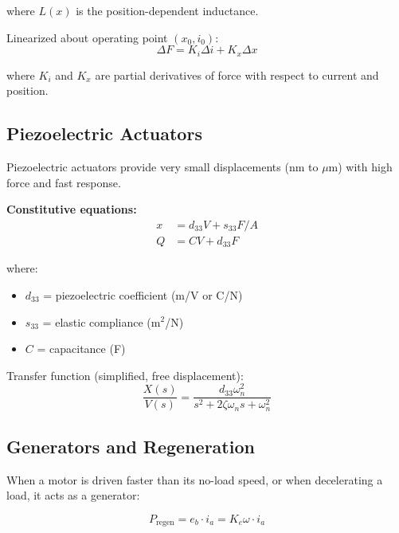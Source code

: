where $L(x)$ is the position-dependent inductance.

Linearized about operating point $(x_0, i_0)$:
\begin{equation}
\Delta F = K_i \Delta i + K_x \Delta x
\end{equation}

where $K_i$ and $K_x$ are partial derivatives of force with respect to current and position.

\subsection{Piezoelectric Actuators}
\label{subsec:piezo}

Piezoelectric actuators provide very small displacements (nm to $\mu$m) with high force and fast response.

\textbf{Constitutive equations:}
\begin{align}
x &= d_{33} V + s_{33} F/A \\
Q &= C V + d_{33} F
\end{align}

where:
\begin{itemize}
    \item $d_{33}$ = piezoelectric coefficient (m/V or C/N)
    \item $s_{33}$ = elastic compliance (m$^2$/N)
    \item $C$ = capacitance (F)
\end{itemize}

Transfer function (simplified, free displacement):
\begin{equation}
\frac{X(s)}{V(s)} = \frac{d_{33}\omega_n^2}{s^2 + 2\zeta\omega_n s + \omega_n^2}
\end{equation}

\subsection{Generators and Regeneration}
\label{subsec:generators}

When a motor is driven faster than its no-load speed, or when decelerating a load, it acts as a generator:

\begin{equation}
P_{\text{regen}} = e_b \cdot i_a = K_e\omega \cdot i_a
\end{equation}

